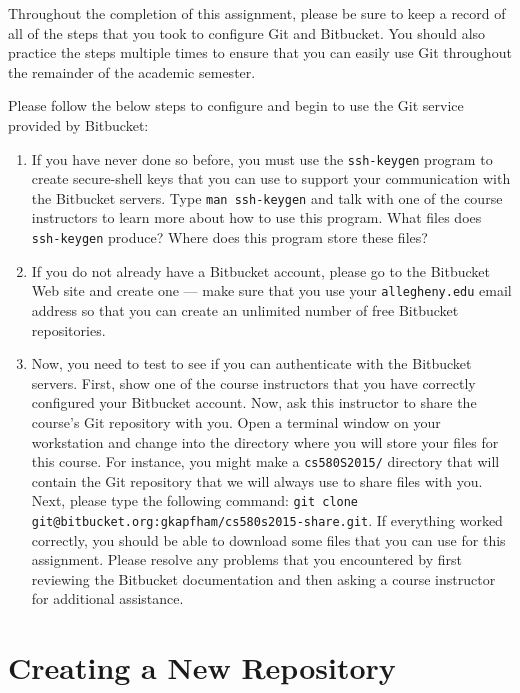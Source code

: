 Throughout the completion of this assignment, please be sure to keep a record of all of the steps that you took to
configure Git and Bitbucket.  You should also practice the steps multiple times to ensure that you can easily use Git
throughout the remainder of the academic semester.

Please follow the below steps to configure and begin to use the Git service provided by Bitbucket:

\begin{enumerate}

  \item If you have never done so before, you must use the {\tt ssh-keygen} program to create secure-shell keys that
    you can use to support your communication with the Bitbucket servers.  Type {\tt man ssh-keygen} and talk with
    one of the course instructors to learn more about how to use this program.  What files does {\tt ssh-keygen} produce?
    Where does this program store these files?

  \item If you do not already have a Bitbucket account, please go to the Bitbucket Web site and create one ---
    make sure that you use your {\tt allegheny.edu} email address so that you can create an unlimited number of free
    Bitbucket repositories.

  \item Now, you need to test to see if you can authenticate with the Bitbucket servers. First, show one of the course
    instructors that you have correctly configured your Bitbucket account.  Now, ask this instructor to share the
    course's Git repository with you.  Open a terminal window on your workstation and change into the directory where
    you will store your files for this course.  For instance, you might make a {\tt cs580S2015/} directory that will
    contain the Git repository that we will always use to share files with you.  Next, please type the following
    command: {\tt git clone git@bitbucket.org:gkapfham/cs580s2015-share.git}.  If everything worked correctly, you
    should be able to download some files that you can use for this assignment. Please resolve any problems that you
    encountered by first reviewing the Bitbucket documentation and then asking a course instructor for additional
    assistance.

\end{enumerate}

\section*{Creating a New Repository}

